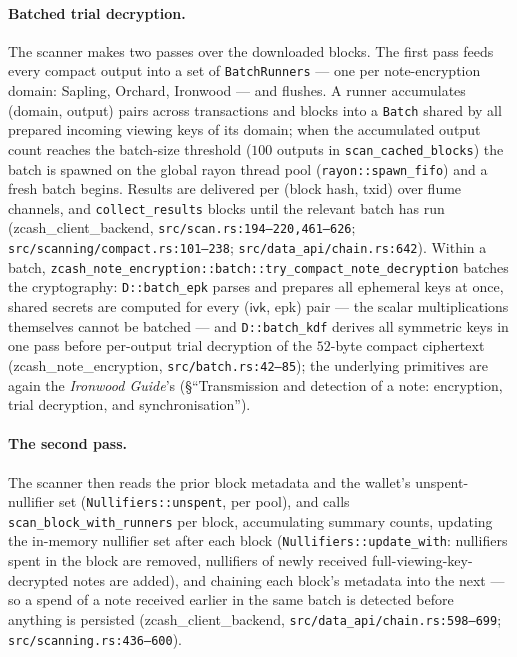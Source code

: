 \documentclass[11pt,a4paper]{article}
\theoremstyle{definition}
\newcommand{\ivk}{\ensuremath{\mathsf{ivk}}}
\begin{document}
\paragraph{Batched trial decryption.} The scanner makes two passes over the
downloaded blocks. The first pass feeds every compact output into a set of
\texttt{BatchRunners} --- one per note-encryption domain: Sapling, Orchard,
Ironwood --- and flushes. A runner accumulates (domain, output) pairs
across transactions and blocks into a \texttt{Batch} shared by all prepared
incoming viewing keys of its domain; when the accumulated output count
reaches the batch-size threshold ($100$ outputs in
\texttt{scan\_cached\_blocks}) the batch is spawned on the global
\textsf{rayon} thread pool (\texttt{rayon::spawn\_fifo}) and a fresh batch
begins. Results are delivered per (block hash, txid) over \textsf{flume}
channels, and \texttt{collect\_results} blocks until the relevant batch has
run (\textsf{zcash\_client\_backend}, \texttt{src/scan.rs:194--220,461--626};
\texttt{src/scanning/compact.rs:101--238};
\texttt{src/data\_api/chain.rs:642}). Within a batch,
\texttt{zcash\_note\_encryption::batch::try\_compact\_note\_decryption}
batches the cryptography: \texttt{D::batch\_epk} parses and prepares all
ephemeral keys at once, shared secrets are computed for every
(\ivk, \textsf{epk}) pair --- the scalar multiplications themselves cannot
be batched --- and \texttt{D::batch\_kdf} derives all symmetric keys in one
pass before per-output trial decryption of the $52$-byte compact ciphertext
(\textsf{zcash\_note\_encryption}, \texttt{src/batch.rs:42--85}); the
underlying primitives are again the \emph{Ironwood Guide}'s
(\S``Transmission and detection of a note: encryption, trial decryption,
and synchronisation'').

\paragraph{The second pass.} The scanner then reads the prior block
metadata and the wallet's unspent-nullifier set
(\texttt{Nullifiers::unspent}, per pool), and calls
\texttt{scan\_block\_with\_runners} per block, accumulating summary counts,
updating the in-memory nullifier set after each block
(\texttt{Nullifiers::update\_with}: nullifiers spent in the block are
removed, nullifiers of newly received full-viewing-key-decrypted notes are
added), and chaining each block's metadata into the next --- so a spend of
a note received earlier in the same batch is detected before anything is
persisted (\textsf{zcash\_client\_backend},
\texttt{src/data\_api/chain.rs:598--699};
\texttt{src/scanning.rs:436--600}).
\end{document}
